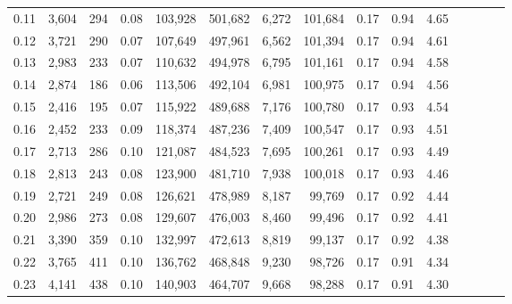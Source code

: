 \begin{tabular}{rrrcrrrrrrrrrrr}
0.11 &   3,604 &    294 &                                       0.08 &  103,928 &  501,682 &    6,272 &  101,684 &  0.17 &  0.94 &                         4.65 \\
0.12 &   3,721 &    290 &                                       0.07 &  107,649 &  497,961 &    6,562 &  101,394 &  0.17 &  0.94 &                         4.61 \\
0.13 &   2,983 &    233 &                                       0.07 &  110,632 &  494,978 &    6,795 &  101,161 &  0.17 &  0.94 &                         4.58 \\
0.14 &   2,874 &    186 &                                       0.06 &  113,506 &  492,104 &    6,981 &  100,975 &  0.17 &  0.94 &                         4.56 \\
0.15 &   2,416 &    195 &                                       0.07 &  115,922 &  489,688 &    7,176 &  100,780 &  0.17 &  0.93 &                         4.54 \\
0.16 &   2,452 &    233 &                                       0.09 &  118,374 &  487,236 &    7,409 &  100,547 &  0.17 &  0.93 &                         4.51 \\
0.17 &   2,713 &    286 &                                       0.10 &  121,087 &  484,523 &    7,695 &  100,261 &  0.17 &  0.93 &                         4.49 \\
0.18 &   2,813 &    243 &                                       0.08 &  123,900 &  481,710 &    7,938 &  100,018 &  0.17 &  0.93 &                         4.46 \\
0.19 &   2,721 &    249 &                                       0.08 &  126,621 &  478,989 &    8,187 &   99,769 &  0.17 &  0.92 &                         4.44 \\
0.20 &   2,986 &    273 &                                       0.08 &  129,607 &  476,003 &    8,460 &   99,496 &  0.17 &  0.92 &                         4.41 \\
0.21 &   3,390 &    359 &                                       0.10 &  132,997 &  472,613 &    8,819 &   99,137 &  0.17 &  0.92 &                         4.38 \\
0.22 &   3,765 &    411 &                                       0.10 &  136,762 &  468,848 &    9,230 &   98,726 &  0.17 &  0.91 &                         4.34 \\
0.23 &   4,141 &    438 &                                       0.10 &  140,903 &  464,707 &    9,668 &   98,288 &  0.17 &  0.91 &                         4.30 \\

\end{tabular}
